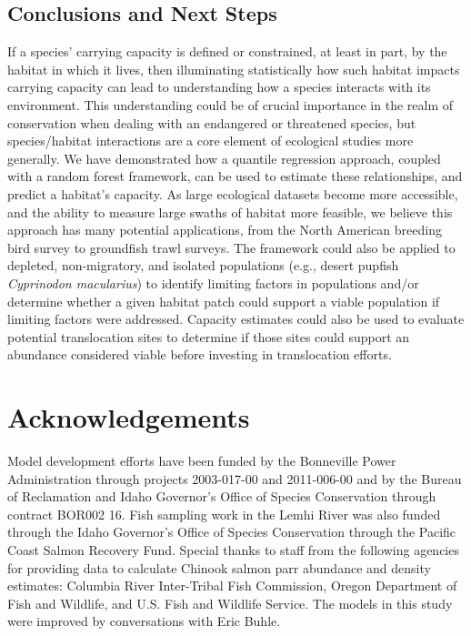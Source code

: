 \documentclass[
  12pt,
]{article}
\begin{document}
\hypertarget{conclusions-and-next-steps}{%
\subsection{Conclusions and Next Steps}\label{conclusions-and-next-steps}}

If a species' carrying capacity is defined or constrained, at least in part, by the habitat in which it lives, then illuminating statistically how such habitat impacts carrying capacity can lead to understanding how a species interacts with its environment. This understanding could be of crucial importance in the realm of conservation when dealing with an endangered or threatened species, but species/habitat interactions are a core element of ecological studies more generally. We have demonstrated how a quantile regression approach, coupled with a random forest framework, can be used to estimate these relationships, and predict a habitat's capacity. As large ecological datasets become more accessible, and the ability to measure large swaths of habitat more feasible, we believe this approach has many potential applications, from the North American breeding bird survey to groundfish trawl surveys. The framework could also be applied to depleted, non-migratory, and isolated populations (e.g., desert pupfish \emph{Cyprinodon macularius}) to identify limiting factors in populations and/or determine whether a given habitat patch could support a viable population if limiting factors were addressed. Capacity estimates could also be used to evaluate potential translocation sites to determine if those sites could support an abundance considered viable before investing in translocation efforts.

\hypertarget{acknowledgements}{%
\section{Acknowledgements}\label{acknowledgements}}

Model development efforts have been funded by the Bonneville Power Administration through projects 2003-017-00 and 2011-006-00 and by the Bureau of Reclamation and Idaho Governor's Office of Species Conservation through contract BOR002 16. Fish sampling work in the Lemhi River was also funded through the Idaho Governor's Office of Species Conservation through the Pacific Coast Salmon Recovery Fund. Special thanks to staff from the following agencies for providing data to calculate Chinook salmon parr abundance and density estimates: Columbia River Inter-Tribal Fish Commission, Oregon Department of Fish and Wildlife, and U.S. Fish and Wildlife Service. The models in this study were improved by conversations with Eric Buhle.
\end{document}
